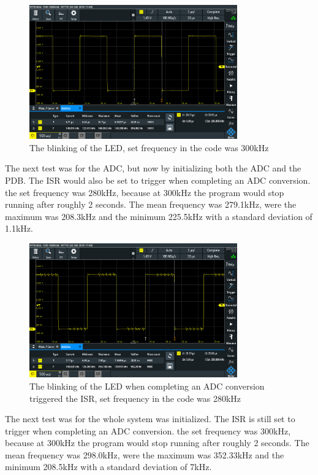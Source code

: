 \begin{figure}[h]
    \centering
    \includegraphics[width=0.8\textwidth]{graphics/STAT03_300.PNG}
    \caption{The blinking of the LED, set frequency in the code was 300kHz}
    \label{fig:PDBsp300}
\end{figure}

The next test was for the ADC, but now by initializing both the ADC and the PDB.
The ISR would also be set to trigger when completing an ADC conversion.
the set frequency was 280kHz, because at 300kHz the program would stop running after roughly 2 seconds.
The mean frequency was 279.1kHz, were the maximum was 208.3kHz and the minimum 225.5kHz with a standard deviation of 1.1kHz. 

\begin{figure}[h]
    \centering
    \includegraphics[width=0.8\textwidth]{graphics/STATADC_280.PNG}
    \caption{The blinking of the LED when completing an ADC conversion triggered the ISR, set frequency in the code was 280kHz}
    \label{fig:PDBADCDMAsp300}
\end{figure}

The next test was for the whole system was initialized.
The ISR is still set to trigger when completing an ADC conversion.
the set frequency was 300kHz, because at 300kHz the program would stop running after roughly 2 seconds.
The mean frequency was 298.0kHz, were the maximum was 352.33kHz and the minimum 208.5kHz with a standard deviation of 7kHz. 


